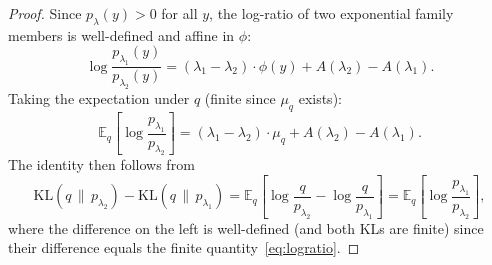 \documentclass[10pt,a4paper]{amsart}
\newcommand{\E}{\mathbb{E}}
\newcommand{\KL}[2]{\mathrm{KL}\!\left(#1 \,\|\, #2\right)}
\begin{document}
\begin{proof}
Since $p_\lambda(y) > 0$ for all $y$, the log-ratio of two exponential family members is well-defined and affine in $\phi$:
\[
    \log \frac{p_{\lambda_1}(y)}{p_{\lambda_2}(y)}
    = (\lambda_1 - \lambda_2) \cdot \phi(y) + A(\lambda_2) - A(\lambda_1).
\]
Taking the expectation under $q$ (finite since $\mu_q$ exists):
\begin{equation}\label{eq:logratio}
    \E_q\!\left[\log \frac{p_{\lambda_1}}{p_{\lambda_2}}\right]
    = (\lambda_1 - \lambda_2) \cdot \mu_q + A(\lambda_2) - A(\lambda_1).
\end{equation}
The identity then follows from
\[
    \KL{q}{p_{\lambda_2}} - \KL{q}{p_{\lambda_1}}
    = \E_q\!\left[\log \frac{q}{p_{\lambda_2}} - \log \frac{q}{p_{\lambda_1}}\right]
    = \E_q\!\left[\log \frac{p_{\lambda_1}}{p_{\lambda_2}}\right],
\]
where the difference on the left is well-defined (and both KLs are finite) since their difference equals the finite quantity~\eqref{eq:logratio}.
\end{proof}
\end{document}
